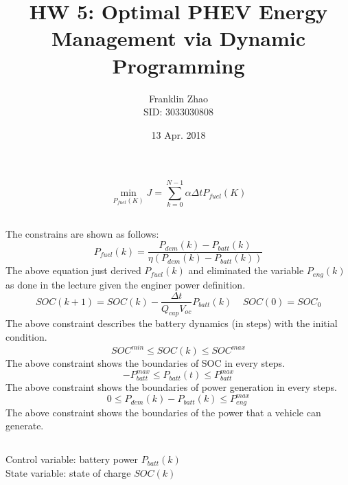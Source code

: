 \documentclass[12pt]{article}
\title{HW 5: Optimal PHEV Energy Management via Dynamic Programming}
\date{13 Apr. 2018}
\author{Franklin Zhao \\ SID: 3033030808}
\begin{document}
	
	\maketitle
	\newcommand{\tabitem}{~~\llap{\textbullet}~~}
	\renewcommand\theequation{\arabic{equation}}
	\renewcommand{\figurename}{Fig.}
	\renewcommand\thesection{Problem \arabic{section}}
	\renewcommand\thesubsection{(\alph{subsection})}
	\onehalfspacing
	
\section{}
\subsection{}
\begin{equation}
\min_{P_{fuel}(K)}J=\sum_{k=0}^{N-1}\alpha\Delta tP_{fuel}(K)
\end{equation}
\subsection{}
The constrains are shown as follows:
\begin{equation}
P_{fuel}(k)=\frac{P_{dem}(k)-P_{batt}(k)}{\eta(P_{dem}(k)-P_{batt}(k))}
\end{equation}
The above equation just derived $P_{fuel}(k)$ and eliminated the variable $P_{eng}(k)$ as done in the lecture given the enginer power definition.
\begin{equation}
SOC(k+1)=SOC(k)-\frac{\Delta t}{Q_{cap}V_{oc}}P_{batt}(k)\ \ \ \ \ SOC(0)=SOC_0
\end{equation}
The above constraint describes the battery dynamics (in steps) with the initial condition.
\begin{equation}
SOC^{min}\leq SOC(k)\leq SOC^{max}
\end{equation}
The above constraint shows the boundaries of SOC in every steps.
\newpage
\begin{equation}
-P_{batt}^{max}\leq P_{batt}(t)\leq P_{batt}^{max}
\end{equation}
The above constraint shows the boundaries of power generation in every steps.
\begin{equation}
0\leq P_{dem}(k)-P_{batt}(k)\leq P_{eng}^{max}
\end{equation}
The above constraint shows the boundaries of the power that a vehicle can generate.
\subsection{}
Control variable: battery power $P_{batt}(k)$\\
State variable: state of charge $SOC(k)$
\end{document}
